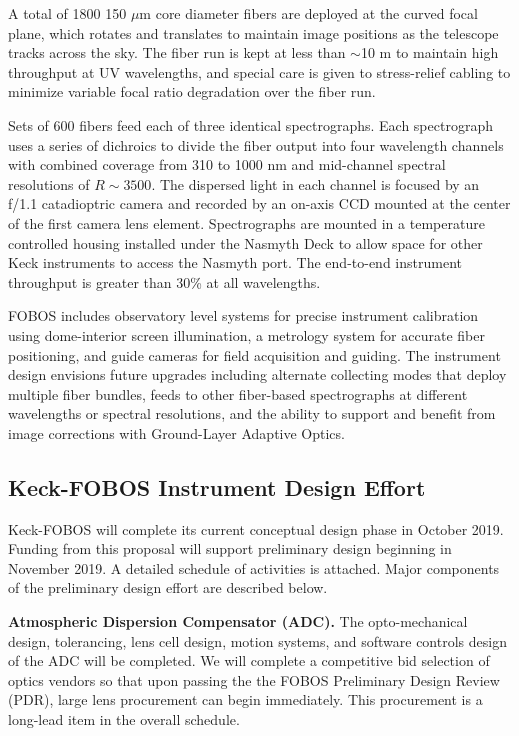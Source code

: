 \documentclass[oneside,11pt]{amsart}
\newcommand{\comment}[2][todo]{{\color{#1}[[{\bf #2}]]}}
\begin{document}
A total of 1800 150 $\mu$m core diameter fibers are deployed at the curved focal plane, which rotates and translates to
maintain image positions as the telescope tracks across the sky.  The fiber run is kept at less than $\sim$10 m to
maintain high throughput at UV wavelengths, and special care is given to stress-relief cabling to minimize variable
focal ratio degradation over the fiber run.

Sets of 600 fibers feed each of three identical spectrographs.  Each spectrograph uses a series of dichroics to divide
the fiber output into four wavelength channels with combined coverage from 310 to 1000 nm and mid-channel spectral
resolutions of $R \sim 3500$.  The dispersed light in each channel is focused by an f/1.1 catadioptric camera and
recorded by an on-axis CCD mounted at the center of the first camera lens element.  Spectrographs are mounted in a
temperature controlled housing installed under the Nasmyth Deck to allow space for other Keck instruments to access the
Nasmyth port.  The end-to-end instrument throughput is greater than 30\% at all wavelengths.

FOBOS includes observatory level systems for precise instrument calibration using dome-interior screen illumination, a
metrology system for accurate fiber positioning, and guide cameras for field acquisition and guiding.  The instrument
design envisions future upgrades including alternate collecting modes that deploy multiple fiber bundles, feeds to
other fiber-based spectrographs at different wavelengths or spectral resolutions, and the ability to support and
benefit from image corrections with Ground-Layer Adaptive Optics.



\subsection{Keck-FOBOS Instrument Design Effort}
\label{sec:design}

Keck-FOBOS will complete its current conceptual design phase in October 2019.  Funding from this proposal will support preliminary design beginning in November 2019.  A detailed schedule of activities is attached.  Major components of the preliminary design effort are described below.

\noindent \textbf{Atmospheric Dispersion Compensator (ADC).} The opto-mechanical design, tolerancing, lens cell design, motion systems, and software controls design of the ADC will be completed.  We will complete a competitive bid selection of optics vendors so that upon passing the the FOBOS Preliminary Design Review (PDR), large lens procurement can begin immediately.  This procurement is a long-lead item in the overall schedule.
\end{document}

